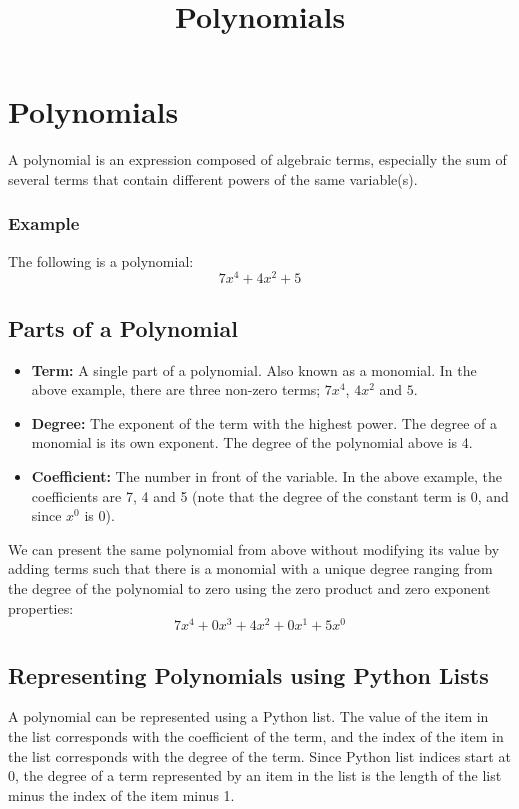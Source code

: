\documentclass{article}
\title{Polynomials}
\author{}
\date{}
\begin{document}
\maketitle

\section*{Polynomials}

A polynomial is an expression composed of algebraic terms, especially the sum of several terms that contain different powers of the same variable(s).

\subsubsection*{Example}
The following is a polynomial:
$$ 7x^4 + 4x^2 + 5 $$

\subsection*{Parts of a Polynomial}
\begin{itemize}
  \item \textbf{Term:} A single part of a polynomial. Also known as a monomial. In the above example, there are three non-zero terms; \( 7x^4 \), \( 4x^2 \) and \( 5 \).
  \item \textbf{Degree:} The exponent of the term with the highest power. The degree of a monomial is its own exponent. The degree of the polynomial above is 4.
  \item \textbf{Coefficient:} The number in front of the variable. In the above example, the coefficients are 7, 4 and 5 (note that the degree of the constant term is 0, and since \(x^0\) is 0).
\end{itemize}

We can present the same polynomial from above without modifying its value by adding terms such that there is a monomial with a unique degree ranging from the degree of the polynomial to zero using the zero product and zero exponent properties:
$$ 7x^4 + 0x^3 + 4x^2 + 0x^1 + 5x^0 $$

\subsection*{Representing Polynomials using Python Lists}

A polynomial can be represented using a Python list. The value of the item in the list corresponds with the coefficient of the term, and the index of the item in the list corresponds with the degree of the term. Since Python list indices start at 0, the degree of a term represented by an item in the list is the length of the list minus the index of the item minus 1.
\end{document}
